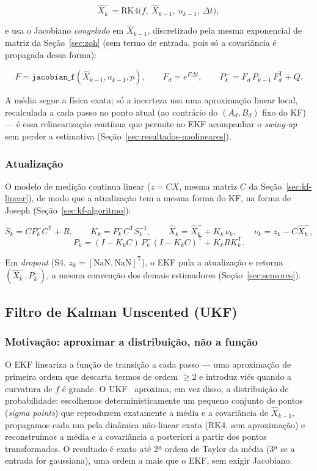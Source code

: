 \documentclass[brazil, 12pt]{article}
\begin{document}
\[
\hat X_k^{-} = \mathrm{RK4}\big(f,\ \hat X_{k-1},\ u_{k-1},\ \Delta t\big),
\]

e usa o Jacobiano \emph{congelado} em $\hat X_{k-1}$, discretizado pela mesma
exponencial de matriz da Seção~\ref{sec:zoh} (sem termo de entrada, pois só a
covariância é propagada dessa forma):

\[
F = \texttt{jacobian\_f}(\hat X_{k-1}, u_{k-1}, p),
\qquad
F_d = e^{F\Delta t},
\qquad
P_k^{-} = F_d\,P_{k-1}\,F_d^{\mathsf T} + Q.
\]

A média segue a física exata; só a incerteza usa uma aproximação linear
local, recalculada a cada passo no ponto atual (ao contrário do $(A_d,B_d)$
fixo do KF) --- é essa relinearização contínua que permite ao EKF acompanhar
o \emph{swing-up} sem perder a estimativa
(Seção~\ref{sec:resultados-naolineares}).

\subsubsection{Atualização}

O modelo de medição continua linear ($z=CX$, mesma matriz $C$ da
Seção~\ref{sec:kf-linear}), de modo que a atualização tem a mesma forma do
KF, na forma de Joseph (Seção~\ref{sec:kf-algoritmo}):

\[
S_k = C P_k^{-} C^{\mathsf T} + R,
\qquad
K_k = P_k^{-} C^{\mathsf T} S_k^{-1},
\qquad
\hat X_k = \hat X_k^{-} + K_k\,\nu_k,
\qquad
\nu_k = z_k - C\hat X_k^{-},
\]
\[
P_k = (I-K_kC)\,P_k^{-}(I-K_kC)^{\mathsf T} + K_k R K_k^{\mathsf T}.
\]

Em \emph{dropout} (S4, $z_k=[\mathrm{NaN},\mathrm{NaN}]^{\mathsf T}$), o EKF
pula a atualização e retorna $(\hat X_k^{-}, P_k^{-})$, a mesma convenção dos
demais estimadores (Seção~\ref{sec:sensores}).

\subsection{Filtro de Kalman Unscented (UKF)}
\label{sec:ukf}

\subsubsection{Motivação: aproximar a distribuição, não a função}

O EKF lineariza a função de transição a cada passo --- uma aproximação de
primeira ordem que descarta termos de ordem $\geq2$ e introduz viés quando a
curvatura de $f$ é grande. O UKF~\cite{wan2000} aproxima, em vez disso, a
distribuição de probabilidade: escolhemos deterministicamente um pequeno
conjunto de pontos (\emph{sigma points}) que reproduzem exatamente a média e a
covariância de $\hat X_{k-1}$, propagamos cada um pela dinâmica não-linear
exata (RK4, sem aproximação) e reconstruímos a média e a covariância a
posteriori a partir dos pontos transformados. O resultado é exato até 2ª
ordem de Taylor da média (3ª se a entrada for gaussiana), uma ordem a mais que
o EKF, sem exigir Jacobiano.
\end{document}
